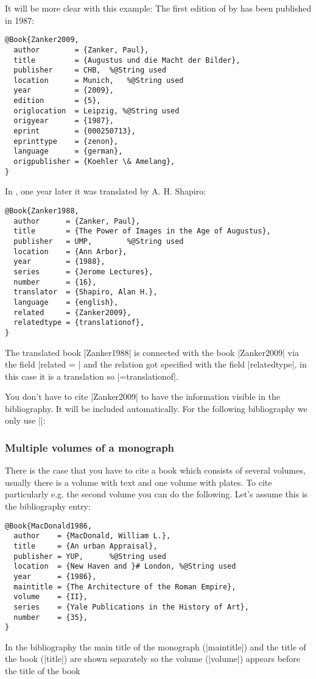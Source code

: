 \documentclass[a4paper,
10pt,
greek,
french,
spanish,
italian,
ngerman,
english
]{ltxdoc}
\begin{document}
It will be more clear with this example:
The first edition of   by \citeauthor*{Zanker2009}  has been published in 1987:
\begin{lstlisting}[style=bibentry,label=Zanker2009,caption={{@}Book\{Zanker2009,…\} }]
@Book{Zanker2009,
  author        = {Zanker, Paul},
  title         = {Augustus und die Macht der Bilder},
  publisher     = CHB, 	%@String used
  location      = Munich,	%@String used
  year          = {2009},
  edition       = {5},
  origlocation  = Leipzig, %@String used
  origyear      = {1987},
  eprint        = {000250713},
  eprinttype    = {zenon},
  language      = {german},
  origpublisher = {Koehler \& Amelang},
}
\end{lstlisting}
In \citeyear{Zanker1988}, one year later  it was translated by A. H. Shapiro:
\begin{lstlisting}[style=bibentry,label=Zanker1988,caption={{@}Book\{Zanker1988,…\} }]
@Book{Zanker1988,
  author      = {Zanker, Paul},
  title       = {The Power of Images in the Age of Augustus},
  publisher   = UMP,		%@String used
  location    = {Ann Arbor},
  year        = {1988},
  series      = {Jerome Lectures},
  number      = {16},
  translator  = {Shapiro, Alan H.},
  language    = {english},
  related     = {Zanker2009},
  relatedtype = {translationof},
}
\end{lstlisting}

The translated book |Zanker1988| is connected with the book |Zanker2009| via the field |related = | and the relation got specified with the field |relatedtype|, in this case it is a translation so |={translationof}|.

You don’t have to cite |Zanker2009| to have the information visible in the bibliography. 
It will be included automatically. For the following bibliography we only use |\cite{Zanker1988}|:



 \subsubsection{Multiple volumes of a monograph}
There is the case that you have to cite a book which consists of several volumes, 
usually there is a volume with text and one volume with plates.
To cite particularly e.g. the second volume you can do the following.
Let’s assume this is the bibliography entry:
\begin{lstlisting}[style=bibentry,label=MacDonald1986,caption={{@}Book\{MacDonald1986,…\} }]
@Book{MacDonald1986,
  author    = {MacDonald, William L.},
  title     = {An urban Appraisal},
  publisher = YUP,		%@String used
  location  = {New Haven and }# London, %@String used
  year      = {1986},
  maintitle = {The Architecture of the Roman Empire},
  volume    = {II},
  series    = {Yale Publications in the History of Art},
  number    = {35},
}
\end{lstlisting}
In the bibliography the main title of the monograph  (|maintitle|) and the title of the book (|title|) are shown separately  so the volume  (|volume|) appears before the title of the book
\end{document}
